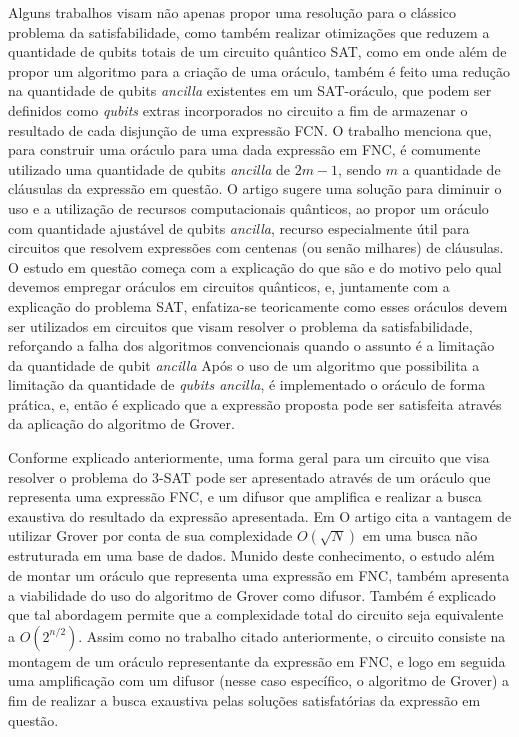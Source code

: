 \documentclass[12pt]{article}
\begin{document}
Alguns trabalhos visam não apenas propor uma resolução para o clássico problema da satisfabilidade, como também realizar otimizações que reduzem a quantidade de qubits totais de um circuito quântico SAT, como em \cite{yang:23} onde além de propor um algoritmo para a criação de uma oráculo, também é feito uma redução  na quantidade de qubits \textit{ancilla} existentes em um SAT-oráculo, que podem ser definidos como \textit{qubits} extras incorporados no circuito a fim de armazenar o resultado de cada disjunção de uma expressão FCN. O trabalho menciona que, para construir uma oráculo para uma dada expressão em FNC, é comumente utilizado uma quantidade de qubits \textit{ancilla} de \( 2m - 1 \), sendo $m$ a quantidade de cláusulas da expressão em questão. O artigo sugere uma solução para diminuir o uso e a utilização de recursos computacionais quânticos, ao propor um oráculo com quantidade ajustável de qubits \textit{ancilla}, recurso especialmente útil para circuitos que resolvem expressões com centenas (ou senão milhares) de cláusulas.
O estudo em questão começa com a explicação do que são e do motivo pelo qual devemos empregar oráculos em circuitos quânticos, e, juntamente com a explicação do problema SAT, enfatiza-se teoricamente como esses oráculos devem ser utilizados em circuitos que visam resolver o problema da satisfabilidade, reforçando a falha dos algoritmos convencionais quando o assunto é a limitação da quantidade de qubit \textit{ancilla}
Após o uso de um algoritmo que possibilita a limitação da quantidade de \textit{qubits ancilla}, é implementado o oráculo de forma prática, e, então é explicado que a expressão proposta pode ser satisfeita através da aplicação do algoritmo de Grover.

Conforme explicado anteriormente, uma forma geral para um circuito que visa resolver o problema do 3-SAT pode ser apresentado através de um oráculo que representa uma expressão FNC, e um difusor que amplifica e realizar a busca exaustiva do resultado da expressão apresentada. Em \cite{wang:20} O artigo cita a vantagem de utilizar Grover por conta de sua complexidade $O \left( \sqrt{N} \right)$ em uma busca não estruturada em uma base de dados. Munido deste conhecimento, o estudo além de montar um oráculo que representa uma expressão em FNC, também apresenta a viabilidade do uso do algoritmo de Grover como difusor. Também é explicado que tal abordagem permite que a complexidade total do circuito seja equivalente a $O(2^{n/2})$. Assim como no trabalho citado anteriormente, o circuito consiste na montagem de um oráculo representante da expressão em FNC, e logo em seguida uma amplificação com um difusor (nesse caso específico, o algoritmo de Grover) a fim de realizar a busca exaustiva pelas soluções satisfatórias da expressão em questão.
\end{document}
